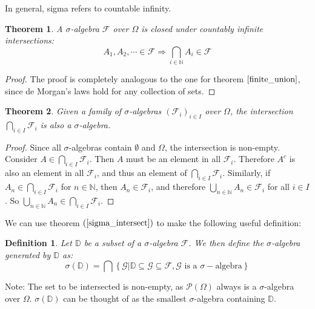 \documentclass[12pt, a4paper]{article}
\newtheorem{theorem}{Theorem}[section]
\newtheorem{definition}{Definition}[section]
\numberwithin{equation}{section}
\begin{document}
In general, sigma refers to countable infinity.

\begin{theorem}
A $\sigma$-algebra $\mathcal{F}$ over $\Omega$ is closed under countably infinite intersections:
\begin{equation}
A_1, A_2,\cdots\in\mathcal{F}\Rightarrow\underset{i\in\mathbb{N}}{\bigcap}A_i\in\mathcal{F}
\end{equation}
\end{theorem}
\begin{proof}
The proof is completely analogous to the one for theorem $\ref{finite_union}$, since de Morgan's laws hold for any collection of sets.
\end{proof}

\begin{theorem}
\label{sigma_intersect}
Given a family of $\sigma$-algebras $(\mathcal{F}_i)_{i\in I}$ over $\Omega$, the intersection $\bigcap_{i\in I}\mathcal{F}_i$ is also a $\sigma$-algebra.
\end{theorem}
\begin{proof}
Since all $\sigma$-algebras contain $\emptyset$ and $\Omega$, the intersection is non-empty. Consider $A\in\bigcap_{i\in I}\mathcal{F}_i$. Then $A$ must be an element in all $\mathcal{F}_i$. Therefore $A^c$ is also an element in all $\mathcal{F}_i$, and thus an element of $\bigcap_{i\in I}\mathcal{F}_i$. Similarly, if $A_n\in\bigcap_{i\in I}\mathcal{F}_i$ for $n\in\mathbb{N}$, then $A_n\in\mathcal{F}_i$, and therefore $\bigcup_{n\in\mathbb{N}}A_n\in\mathcal{F}_i$ for all $i\in I$. So $\bigcup_{n\in\mathbb{N}}A_n\in\bigcap_{i\in I}\mathcal{F}_i$.
\end{proof}

We can use theorem $(\ref{sigma_intersect})$ to make the following useful definition:

\begin{definition}
Let $\mathbb{D}$ be a subset of a $\sigma$-algebra $\mathcal{F}$. We then define the $\sigma$-algebra generated by $\mathbb{D}$ as:
\begin{equation}
\sigma(\mathbb{D})=\bigcap\left\{\mathcal{G}|\mathbb{D}\subseteq\mathcal{G}\subseteq\mathcal{F}, \mathcal{G}\textrm{ is a }\sigma-\textrm{algebra}\right\}
\end{equation}
\end{definition}

Note: The set to be intersected is non-empty, as $\mathcal{P}(\Omega)$ always is a $\sigma$-algebra over $\Omega$. $\sigma(\mathbb{D})$ can be thought of as the smallest $\sigma$-algebra containing $\mathbb{D}$.
\end{document}
